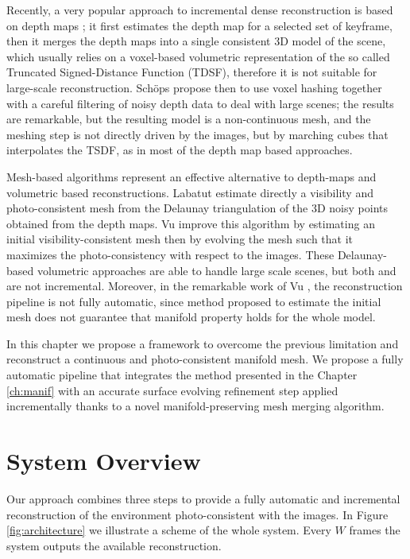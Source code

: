 Recently, a very popular approach to  incremental dense reconstruction is based on depth maps\cite{pollefeys_et_al_08,collins1996space,newcombe2010live,ohtake2003multi,stuhmer2012parallel,stuckler2014multi} ; it first estimates the depth map for a selected set of keyframe, then it merges the depth maps into a single consistent 3D model of the scene, which usually relies on a voxel-based volumetric representation of the so called Truncated Signed-Distance Function (TDSF), therefore it is not suitable for large-scale reconstruction. 
Sch{\"o}ps \etal \cite{schops20153d} propose then to use voxel hashing together with a careful filtering of noisy depth data to deal with large scenes; the results are remarkable, but the resulting model is a non-continuous mesh, and the meshing step is not directly driven by the images, but by marching cubes \cite{lorensen1987marching} that interpolates the TSDF, as in most of the depth map based approaches.

Mesh-based algorithms represent an effective alternative to depth-maps and volumetric based reconstructions. Labatut \etal \cite{labatut2007efficient} estimate directly a visibility and photo-consistent mesh from the Delaunay triangulation of the 3D noisy points obtained from the depth maps.
Vu \etal  \cite{vu_et_al_2012} improve this algorithm by estimating an initial visibility-consistent mesh then by evolving the mesh such that it maximizes the photo-consistency with respect to the images. 
These Delaunay-based volumetric approaches are able to handle large scale scenes, but both \cite{labatut2007efficient} and \cite{vu_et_al_2012}  are not incremental.
Moreover, in the remarkable work of Vu \etal \cite{vu_et_al_2012}, the reconstruction pipeline   is not fully automatic, since  method proposed to estimate the initial mesh does not guarantee that manifold property holds for the whole model.



In this chapter we propose a framework to overcome the previous limitation and reconstruct a continuous and photo-consistent manifold mesh. 
We propose a fully automatic pipeline that integrates the method presented in the Chapter \ref{ch:manif}  with an accurate surface evolving refinement step applied incrementally thanks to a novel manifold-preserving mesh merging algorithm.


\section{System Overview}
 Our approach combines three steps  to provide a fully automatic and incremental reconstruction of the environment photo-consistent with the images. In Figure \ref{fig:architecture} we illustrate a scheme of the whole system. Every  $W$ frames the system outputs the available reconstruction.
 
